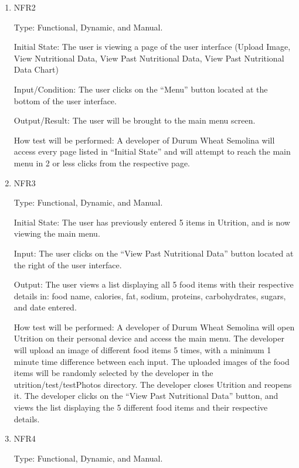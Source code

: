 \documentclass[12pt, titlepage]{article}
\begin{document}
\begin{enumerate}

\item{NFR2\\}

Type: Functional, Dynamic, and Manual.
					
Initial State: The user is viewing a page of the user interface (Upload Image, View Nutritional Data, View Past Nutritional Data, View Past Nutritional Data Chart)
					
Input/Condition: The user clicks on the “Menu” button located at the bottom of the user interface.
					
Output/Result: The user will be brought to the main menu screen.

How test will be performed: A developer of Durum Wheat Semolina will access every page listed in “Initial State” and will attempt to reach the main menu in 2 or less clicks from the respective page.

					
\item{NFR3\\}

Type: Functional, Dynamic, and Manual.
					
Initial State: The user has previously entered 5 items in Utrition, and is now viewing the main menu.
					
Input: The user clicks on the “View Past Nutritional Data” button located at the right of the user interface.
					
Output: The user views a list displaying all 5 food items with their respective details in: food name, calories, fat, sodium, proteins, carbohydrates, sugars, and date entered.
					
How test will be performed: A developer of Durum Wheat Semolina will open Utrition on their personal device and access the main menu. The developer will upload an image of different food items 5 times, with a minimum 1 minute time difference between each input. The uploaded images of the food items will be randomly selected by the developer in the utrition/test/testPhotos directory. The developer closes Utrition and reopens it. The developer clicks on the “View Past Nutritional Data” button, and views the list displaying the 5 different food items and their respective details.

\item{NFR4\\}

Type: Functional, Dynamic, and Manual.


\end{enumerate}
\end{document}
